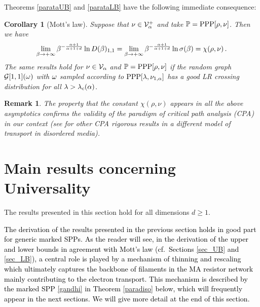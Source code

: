 \documentclass[12pt,a4paper,reqno]{amsart}
\newtheorem{Corollary}[Theorem]{Corollary}
\newtheorem{Remark}[Theorem]{Remark}
\newcommand{\cG}{\ensuremath{\mathcal G}}
\newcommand{\cV}{\ensuremath{\mathcal V}}
\newcommand{\bbP}{{\ensuremath{\mathbb P}} }
\let\a=\alpha \let\b=\beta   \let\d=\delta  \let\e=\varepsilon
\newcommand{\rosso}{\textcolor{black}} %
\newcommand{\blu}{\textcolor{black}}
\newcommand{\cv}{\rosso{\cV_\alpha}}
\newcommand{\cvp}{\rosso{\cV^+_\alpha}}
\begin{document}
\medskip

Theorems \ref{parataUB} and \ref{parataLB} have the following immediate consequence:
\begin{Corollary}[Mott's law] \label{immenso}
Suppose that  $\nu\in \cvp$ and take $\bbP={\rm PPP}[\rho,\nu]$.
Then we have 
 \[  \lim _{\b\to +\infty} \b^{- \rosso{\frac{\a+1}{\a+1+d}} } \ln D(\b)_{1,1}  =     \lim _{\b\to +\infty} \b^{- \rosso{\frac{\a+1}{\a+1+d}} } \ln \s(\b)=    \chi (\rho, \nu)\,.
\]
  The same results hold for $\nu\in \cv$ and $\bbP={\rm PPP}[\rho,\nu]$ if 
the random graph $\cG[1,1](\o)$ with $\omega$ sampled according to ${\rm PPP}[ \lambda, \nu_{1,\alpha}] $ has a good LR crossing distribution  for all  $\l>\l_c(\a)$.
\end{Corollary}

\begin{Remark} The property that the constant $\chi(\rho,\nu)$ appears in all the above asymptotics confirms the validity of the paradigm of critical path analysis (CPA) in our context (see \cite{Ji} for other CPA  rigorous results in   a different model of transport in disordered media).
\end{Remark}

\section{Main results concerning Universality}\label{MR_univ}


 The results presented in this section hold for all dimensions $d\geq 1$.
 
 \medskip 
  \blu{The derivation of the results presented  in the previous section holds in good part for generic marked SPPs. As the reader will see, in the derivation of the  upper  and lower bounds in agreement with Mott's law  (cf.~Sections \ref{sec_UB} and \ref{sec_LB}), a central role is played by a  mechanism of thinning and rescaling which ultimately  captures the backbone of  filaments in the MA resistor network mainly contributing to the electron transport. This mechanism is described by the marked SPP \eqref{gandhi} in Theorem \ref{paradiso} below, which will frequently appear in the next sections. We will give more detail at the end of this section. }
  
\end{document}
